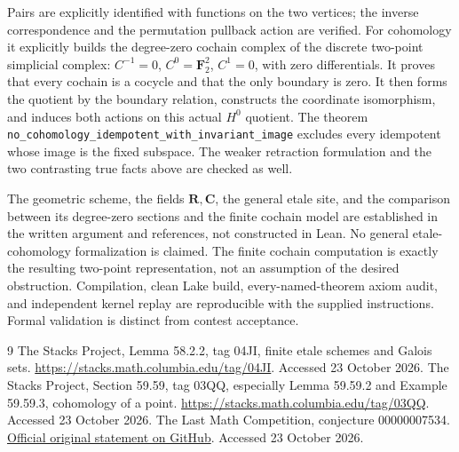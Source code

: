 \documentclass[10pt]{article}
\newcommand{\F}{\mathbf F_2}
\begin{document}
Pairs are explicitly identified with functions on the two vertices; the inverse correspondence and the permutation pullback action are verified. For cohomology it explicitly builds the degree-zero cochain complex of the discrete two-point simplicial complex: $C^{-1}=0$, $C^0=\F^2$, $C^1=0$, with zero differentials. It proves that every cochain is a cocycle and that the only boundary is zero. It then forms the quotient by the boundary relation, constructs the coordinate isomorphism, and induces both actions on this actual $H^0$ quotient. The theorem
\texttt{no\_cohomology\_idempotent\_with\_invariant\_image}
excludes every idempotent whose image is the fixed subspace. The weaker retraction formulation and the two contrasting true facts above are checked as well.

The geometric scheme, the fields $\mathbf R,\mathbf C$, the general etale site, and the comparison between its degree-zero sections and the finite cochain model are established in the written argument and references, not constructed in Lean. No general etale-cohomology formalization is claimed. The finite cochain computation is exactly the resulting two-point representation, not an assumption of the desired obstruction. Compilation, clean Lake build, every-named-theorem axiom audit, and independent kernel replay are reproducible with the supplied instructions. Formal validation is distinct from contest acceptance.
\begin{thebibliography}{9}
 The Stacks Project, Lemma 58.2.2, tag 04JI, finite etale schemes and Galois sets. \url{https://stacks.math.columbia.edu/tag/04JI}. Accessed 23 October 2026.
 The Stacks Project, Section 59.59, tag 03QQ, especially Lemma 59.59.2 and Example 59.59.3, cohomology of a point. \url{https://stacks.math.columbia.edu/tag/03QQ}. Accessed 23 October 2026.
 The Last Math Competition, conjecture 00000007534. \href{https://github.com/The-Last-Math-Competition/The-Last-Math-Competition/blob/main/conjectures/00000007534.md}{Official original statement on GitHub}. Accessed 23 October 2026.
\end{thebibliography}
\end{document}
